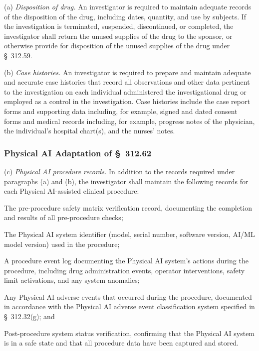 (a) \textit{Disposition of drug.} An investigator is required to maintain adequate records of the disposition of the drug, including dates, quantity, and use by subjects. If the investigation is terminated, suspended, discontinued, or completed, the investigator shall return the unused supplies of the drug to the sponsor, or otherwise provide for disposition of the unused supplies of the drug under \S~312.59.

(b) \textit{Case histories.} An investigator is required to prepare and maintain adequate and accurate case histories that record all observations and other data pertinent to the investigation on each individual administered the investigational drug or employed as a control in the investigation. Case histories include the case report forms and supporting data including, for example, signed and dated consent forms and medical records including, for example, progress notes of the physician, the individual's hospital chart(s), and the nurses' notes.

\subsubsection{Physical AI Adaptation of \S~312.62}

(c) \textit{Physical AI procedure records.} In addition to the records required under paragraphs (a) and (b), the investigator shall maintain the following records for each Physical AI-assisted clinical procedure:

\begin{description}[leftmargin=0.8cm,style=sameline]
\item[(i)] The pre-procedure safety matrix verification record, documenting the completion and results of all pre-procedure checks;
\item[(ii)] The Physical AI system identifier (model, serial number, software version, AI/ML model version) used in the procedure;
\item[(iii)] A procedure event log documenting the Physical AI system's actions during the procedure, including drug administration events, operator interventions, safety limit activations, and any system anomalies;
\item[(iv)] Any Physical AI adverse events that occurred during the procedure, documented in accordance with the Physical AI adverse event classification system specified in \S~312.32(g); and
\item[(v)] Post-procedure system status verification, confirming that the Physical AI system is in a safe state and that all procedure data have been captured and stored.
\end{description}

